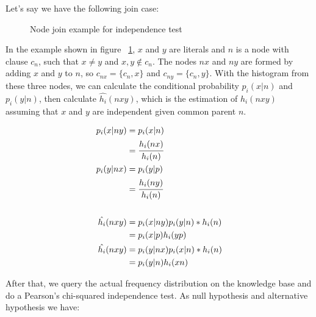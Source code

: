 Let's say we have the following join case:
 
\begin{figure}[!h]
  \caption{Node join example for independence test}
  \centering
  \label{fig:joinIndepExample}
\end{figure}

In the example shown in figure ~\ref{fig:joinIndepExample}, $x$ and $y$ are literals and $n$ is a node with clause
$c_n$,
such that $x \neq y$ and $x,y \not \in c_n$. The nodes $nx$ and $ny$ are formed by adding $x$ and $y$ to $n$, so
$c_{nx}=\{c_n,x\}$ and $c_{ny}=\{c_n,y\}$. With the histogram from these three nodes, we can calculate the conditional
probability $p_i(x|n)$ and $p_i(y|n)$, then calculate $\hat{h_i}(nxy)$, which is the estimation of
$h_i(nxy)$ assuming that $x$ and $y$ are independent given common parent $n$.

\begin{align*}
\label{eq:condindep}
 p_i(x|ny) &= p_i(x|n) \\ 
 &= \cfrac{h_i(nx)}{h_i(n)} \\ 
 p_i(y|nx) &= p_i(y|p) \\ 
 &= \cfrac{h_i(ny)}{h_i(n)} \\ \\ 
 \hat{h_i}(nxy) &= p_i(x|ny)p_i(y|n)*h_i(n) \\ 
 &= p_i(x|p)h_i(yp) \\ 
 \hat{h_i}(nxy) &= p_i(y|nx)p_i(x|n)*h_i(n) \\ 
 &= p_i(y|n)h_i(xn)
\end{align*}

After that, we query the actual frequency distribution on the knowledge base and do a Pearson's chi-squared
independence test. As null hypothesis and alternative hypothesis we have:

